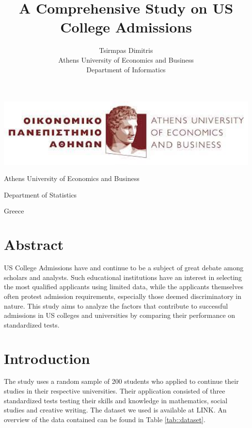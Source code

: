 \documentclass[10pt]{article}
\title{\Huge A Comprehensive Study on US College Admissions  }
\author{\large Tsirmpas Dimitris\\Athens University of Economics and Business\\Department of Informatics}
\begin{document}
	
	\begin{titlepage}
		\maketitle
		\begin{center}
					
			\includegraphics[width=1\textwidth]{aueb_logo.jpg}
			
			\large Athens University of Economics and Business
			
			\large Department of Statistics
			
			\large Greece
		\end{center}
	
	\end{titlepage}
	
	\tableofcontents
	\newpage
	
	\section{Abstract}
	US College Admissions have and continue to be a subject of great debate among scholars and analysts. Such educational institutions have an interest in selecting the most qualified applicants using limited data, while the applicants themselves often protest admission requirements, especially those deemed discriminatory in nature. This study aims to analyze the factors that contribute to successful admissions in US colleges and universities by comparing their performance on standardized tests.
	
	
	\section{Introduction}
	The study uses a random sample of 200 students who applied to continue their studies in their respective universities. Their application consisted of three standardized tests testing their skills and knowledge in mathematics, social studies and creative writing. The dataset we used is available at LINK.  An overview of the data contained can be found in Table \ref{tab::dataset}.
	
\end{document}
